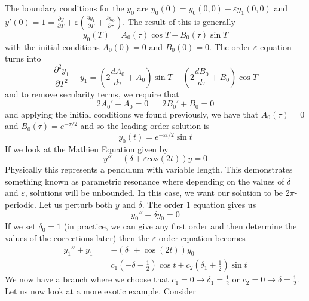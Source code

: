 \documentclass{article}
\newcommand{\pd}[2]{\frac{\partial #1}{\partial #2}}
\newcommand{\od}[2]{\frac{d #1}{d #2}}
\newcommand{\pdt}[2]{\frac{\partial ^2 #1}{\partial #2 ^2}}
\newcommand{\twen}{\hspace{20pt}}
\begin{document}
The boundary conditions for the $y_0$ are $y_0(0) = y_0(0,0)+\varepsilon y_1(0,0)$ and $y'(0) = 1 = \pd{y}{T} + \varepsilon \left( \pd{y_1}{T} + \pd{y_0}{\tau} \right) $. The result of this is generally 
\begin{equation*}
    y_0 (T) = A_0(\tau) \cos T + B_0(\tau) \sin T
\end{equation*}
with the initial conditions $A_0(0)=0$ and $B_0(0)=0$. The order $\varepsilon$ equation turns into 
\begin{equation*}
    \pdt{y_1}{T} +y _1 = \left( 2 \od{A_0}{\tau} + A_0\right) \sin T - \left( 2\od{B_0}{\tau} + B_0 \right) \cos T
\end{equation*}
and to remove secularity terms, we require that 
\begin{equation*}
    2A_0'+A_0 =0 \twen 2B_0' +B_0 =0 
\end{equation*}
and applying the initial conditions we found previously, we have that $A_0(\tau ) =0$ and $B_0(\tau) =e^{-\tau/2}$ and so the leading order solution is 
\begin{equation*}
    y_0(t) = e^{-\varepsilon t/2}\sin t
\end{equation*}
If we look at the Mathieu Equation given by 
\begin{equation*}
    y''+(\delta +\varepsilon cos(2t))y = 0
\end{equation*}
Physically this represents a pendulum with variable length. This demonstrates something known as parametric resonance where depending on the values of $\delta$ and $\varepsilon$, solutions will be unbounded. In this case, we want our solution to be $2\pi$-periodic. Let us perturb both $y$ and $\delta$. The order $1$ equation gives us 
\begin{equation*}
    y_0'' + \delta y_0 =0
\end{equation*}
If we set $\delta_0=1$ (in practice, we can give any first order and then determine the values of the corrections later) then the $\varepsilon$ order equation becomes 
\begin{equation*}
    \begin{split}
        y_1 ''+y_1 &= -(\delta_1 + \cos (2t))y_0 \\
        &= c_1\left(-\delta - \frac{1}{2}\right)\cos t+c_2 \left( \delta_1 +\frac{1}{2} \right) \sin t
    \end{split}
\end{equation*}
We now have a branch where we choose that $c_1=0\to \delta_1 = \frac{1}{2}$ or $c_2 =0 \to \delta = \frac{1}{2}$. Let us now look at a more exotic example. Consider 
\end{document}
